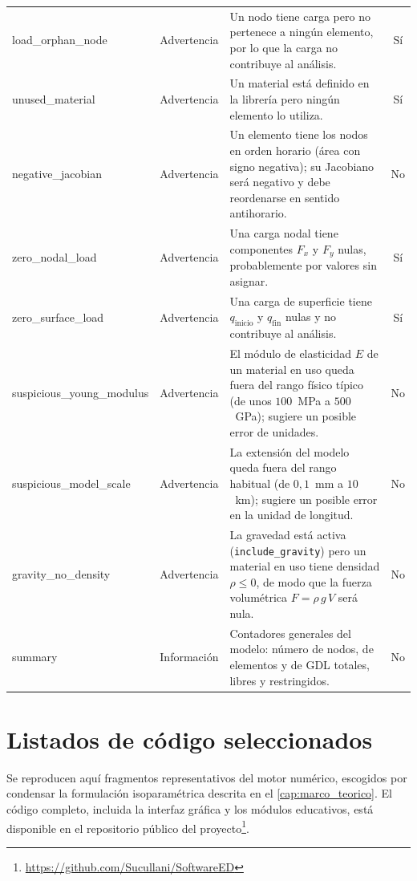 \begin{longtable}{@{}>{\ttfamily\footnotesize}p{2.8cm} >{\footnotesize}l >{\footnotesize\raggedright\arraybackslash}p{5.4cm} >{\footnotesize}c@{}}
load\_orphan\_node & Advertencia & Un nodo tiene carga pero no pertenece a ningún elemento, por lo que la carga no contribuye al análisis. & Sí \\
\addlinespace
unused\_material & Advertencia & Un material está definido en la librería pero ningún elemento lo utiliza. & Sí \\
\addlinespace
negative\_jacobian & Advertencia & Un elemento tiene los nodos en orden horario (área con signo negativa); su Jacobiano será negativo y debe reordenarse en sentido antihorario. & No \\
\addlinespace
zero\_nodal\_load & Advertencia & Una carga nodal tiene componentes $F_x$ y $F_y$ nulas, probablemente por valores sin asignar. & Sí \\
\addlinespace
zero\_surface\_load & Advertencia & Una carga de superficie tiene $q_{\text{inicio}}$ y $q_{\text{fin}}$ nulas y no contribuye al análisis. & Sí \\
\addlinespace
suspicious\_young\_modulus & Advertencia & El módulo de elasticidad $E$ de un material en uso queda fuera del rango físico típico (de unos \mbox{$100$~MPa} a \mbox{$500$~GPa}); sugiere un posible error de unidades. & No \\
\addlinespace
suspicious\_model\_scale & Advertencia & La extensión del modelo queda fuera del rango habitual (de \mbox{$0{,}1$~mm} a \mbox{$10$~km}); sugiere un posible error en la unidad de longitud. & No \\
\addlinespace
gravity\_no\_density & Advertencia & La gravedad está activa (\texttt{include\_gravity}) pero un material en uso tiene densidad $\rho \le 0$, de modo que la fuerza volumétrica $F = \rho\, g\, V$ será nula. & No \\
\midrule

summary & Información & Contadores generales del modelo: número de nodos, de elementos y de GDL totales, libres y restringidos. & No \\

\end{longtable}



\chapter{Listados de código seleccionados}
\label{anexo:codigo}

Se reproducen aquí fragmentos representativos del motor numérico, escogidos por condensar la formulación isoparamétrica descrita en el \autoref{cap:marco_teorico}. El código completo, incluida la interfaz gráfica y los módulos educativos, está disponible en el repositorio público del proyecto\footnote{\url{https://github.com/Sucullani/SoftwareED}}.

